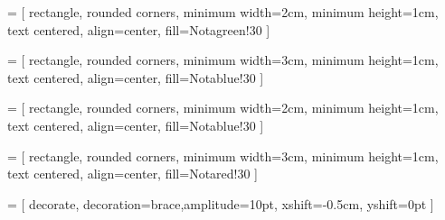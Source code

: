 \newcommand{\distance}{5cm}

 = [
    rectangle, rounded corners, 
    minimum width=2cm, 
    minimum height=1cm,
    text centered,  
    align=center,
    fill=Notagreen!30
]

 = [
    rectangle, rounded corners, 
    minimum width=3cm, 
    minimum height=1cm,
    text centered,  
    align=center,
    fill=Notablue!30
]

 = [
    rectangle, rounded corners, 
    minimum width=2cm, 
    minimum height=1cm,
    text centered,  
    align=center,
    fill=Notablue!30
]

 = [
    rectangle, rounded corners, 
    minimum width=3cm, 
    minimum height=1cm,
    text centered,  
    align=center,
    fill=Notared!30
]

 = [
    decorate,
    decoration={brace,amplitude=10pt},
    xshift=-0.5cm,
    yshift=0pt
]

\usetikzlibrary{decorations.pathreplacing}

